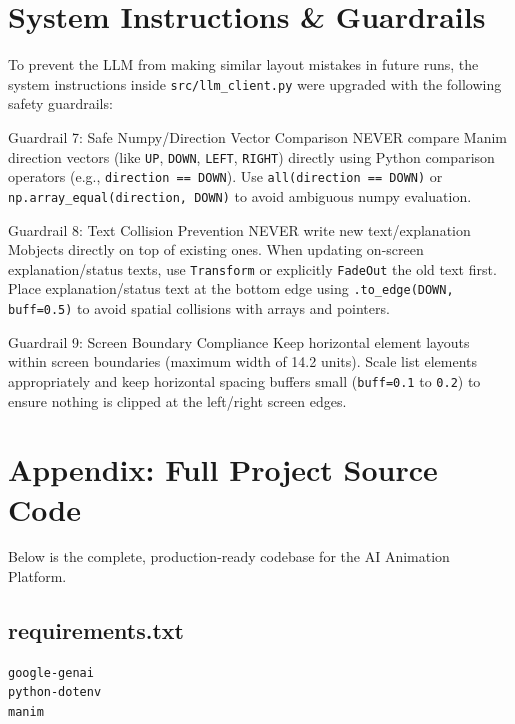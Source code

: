 \documentclass[11pt,a4paper]{article}
\begin{document}
\section{System Instructions \& Guardrails}
To prevent the LLM from making similar layout mistakes in future runs, the system instructions inside \texttt{src/llm\_client.py} were upgraded with the following safety guardrails:

\begin{guardrailbox}{Guardrail 7: Safe Numpy/Direction Vector Comparison}
NEVER compare Manim direction vectors (like \texttt{UP}, \texttt{DOWN}, \texttt{LEFT}, \texttt{RIGHT}) directly using Python comparison operators (e.g., \texttt{direction == DOWN}). Use \texttt{all(direction == DOWN)} or \texttt{np.array\_equal(direction, DOWN)} to avoid ambiguous numpy evaluation.
\end{guardrailbox}

\begin{guardrailbox}{Guardrail 8: Text Collision Prevention}
NEVER write new text/explanation Mobjects directly on top of existing ones. When updating on-screen explanation/status texts, use \texttt{Transform} or explicitly \texttt{FadeOut} the old text first. Place explanation/status text at the bottom edge using \texttt{.to\_edge(DOWN, buff=0.5)} to avoid spatial collisions with arrays and pointers.
\end{guardrailbox}

\begin{guardrailbox}{Guardrail 9: Screen Boundary Compliance}
Keep horizontal element layouts within screen boundaries (maximum width of 14.2 units). Scale list elements appropriately and keep horizontal spacing buffers small (\texttt{buff=0.1} to \texttt{0.2}) to ensure nothing is clipped at the left/right screen edges.
\end{guardrailbox}

\newpage
\section{Appendix: Full Project Source Code}

Below is the complete, production-ready codebase for the AI Animation Platform.

\subsection{requirements.txt}
\begin{lstlisting}[language=bash]
google-genai
python-dotenv
manim
\end{lstlisting}
\end{document}
